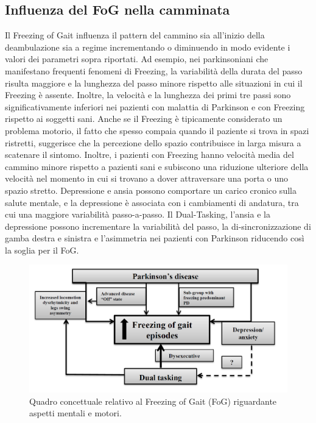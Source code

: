 \subsection{Influenza del FoG nella camminata}
Il Freezing of Gait influenza il pattern del cammino sia all’inizio della deambulazione sia a regime incrementando o diminuendo in modo evidente i valori dei parametri sopra riportati. Ad esempio, nei parkinsoniani che manifestano frequenti fenomeni di Freezing, la variabilità della durata del passo risulta maggiore e la lunghezza del passo minore rispetto alle situazioni in cui il Freezing è assente. Inoltre, la velocità e la lunghezza dei primi tre passi sono significativamente inferiori nei pazienti con malattia di Parkinson e con Freezing rispetto ai soggetti sani. Anche se il Freezing è tipicamente considerato un problema motorio, il fatto che spesso compaia quando il paziente si trova in spazi ristretti, suggerisce che la percezione dello spazio contribuisce in larga misura a scatenare il sintomo\cite{37}. Inoltre, i pazienti con Freezing hanno velocità media del cammino minore rispetto a pazienti sani e subiscono una riduzione ulteriore della velocità nel momento in cui si trovano a dover attraversare una porta o uno spazio stretto. Depressione e ansia possono comportare un carico cronico sulla salute mentale, e la depressione è associata con i cambiamenti di andatura, tra cui una maggiore variabilità passo-a-passo. Il Dual-Tasking, l’ansia e la depressione possono incrementare la variabilità del passo, la di-sincronizzazione di gamba destra e sinistra e l'asimmetria nei pazienti con Parkinson riducendo così la soglia per il FoG. \\
\begin{figure}[]
	\centering
	\includegraphics[scale=0.3]{images/Schema_Concettuale_Stress.png}
	\caption{Quadro concettuale relativo al Freezing of Gait (FoG) riguardante aspetti mentali e motori.}
\end{figure}

